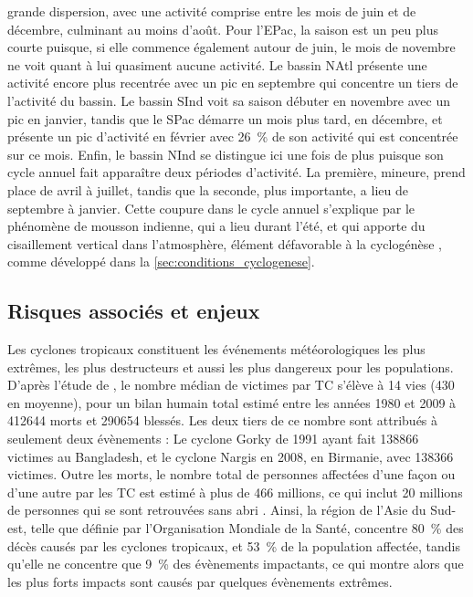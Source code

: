 \documentclass[../main.tex]{subfiles}
\begin{document}
grande dispersion, avec une activité comprise entre les mois de juin et de décembre, culminant au moins d'août. Pour l'EPac, la saison est un peu plus courte
puisque, si elle commence également autour de juin, le mois de novembre ne voit quant à lui quasiment aucune activité. Le bassin NAtl présente une activité
encore plus recentrée avec un pic en septembre qui concentre un tiers de l'activité du bassin. Le bassin SInd voit sa saison débuter en novembre avec un pic en
janvier, tandis que le SPac démarre un mois plus tard, en décembre, et présente un pic d'activité en février avec \SI{26}{\percent} de son activité qui est
concentrée sur ce mois. Enfin, le bassin NInd se distingue ici une fois de plus puisque son cycle annuel fait apparaître deux périodes d'activité. La première,
mineure, prend place de avril à juillet, tandis que la seconde, plus importante, a lieu de septembre à janvier. Cette coupure dans le cycle annuel s'explique
par le phénomène de mousson indienne, qui a lieu durant l'été, et qui apporte du cisaillement vertical dans l'atmosphère, élément défavorable à la cyclogénèse
\parencite{gray_global_1968}, comme développé dans la \cref{sec:conditions_cyclogenese}.

\subsection{Risques associés et enjeux}\label{sec:risques}

Les cyclones tropicaux constituent les événements météorologiques les plus extrêmes, les plus destructeurs et aussi les plus dangereux pour les populations.
D'après l'étude de \cite{doocy_human_2013}, le nombre médian de victimes par TC s'élève à \num{14} vies (\num{430} en moyenne), pour un bilan humain total
estimé entre les années 1980 et 2009 à \num{412644} morts et \num{290654} blessés. Les deux tiers de ce nombre sont attribués à seulement deux évènements : Le
cyclone Gorky de 1991 ayant fait \num{138866} victimes au Bangladesh, et le cyclone Nargis en 2008, en Birmanie, avec \num{138366} victimes. Outre les morts, le
nombre total de personnes affectées d'une façon ou d'une autre par les TC est estimé à plus de \num{466} millions, ce qui inclut \num{20} millions de personnes
qui se sont retrouvées sans abri \parencite{doocy_human_2013}. Ainsi, la région de l'Asie du Sud-est, telle que définie par l'Organisation Mondiale de la Santé,
concentre \SI{80}{\percent} des décès causés par les cyclones tropicaux, et \SI{53}{\percent} de la population affectée, tandis qu'elle ne concentre que
\SI{9}{\percent} des évènements impactants, ce qui montre alors que les plus forts impacts sont causés par quelques évènements extrêmes.
\end{document}
